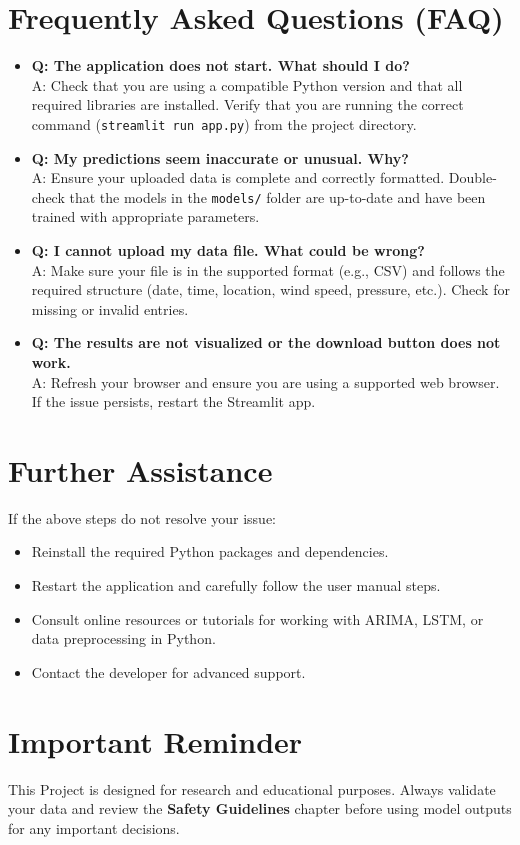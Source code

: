 \section*{Frequently Asked Questions (FAQ)}
\begin{itemize}
	\item \textbf{Q: The application does not start. What should I do?} \\
	A: Check that you are using a compatible Python version and that all required libraries are installed. Verify that you are running the correct command (\texttt{streamlit run app.py}) from the project directory.
	
	\item \textbf{Q: My predictions seem inaccurate or unusual. Why?} \\
	A: Ensure your uploaded data is complete and correctly formatted. Double-check that the models in the \texttt{models/} folder are up-to-date and have been trained with appropriate parameters.
	
	\item \textbf{Q: I cannot upload my data file. What could be wrong?} \\
	A: Make sure your file is in the supported format (e.g., CSV) and follows the required structure (date, time, location, wind speed, pressure, etc.). Check for missing or invalid entries.
	
	\item \textbf{Q: The results are not visualized or the download button does not work.} \\
	A: Refresh your browser and ensure you are using a supported web browser. If the issue persists, restart the Streamlit app.
\end{itemize}

\section*{Further Assistance}
If the above steps do not resolve your issue:
\begin{itemize}
	\item Reinstall the required Python packages and dependencies.
	\item Restart the application and carefully follow the user manual steps.
	\item Consult online resources or tutorials for working with ARIMA, LSTM, or data preprocessing in Python.
	\item Contact the developer for advanced support.
\end{itemize}

\section*{Important Reminder}
This Project is designed for research and educational purposes. Always validate your data and review the \textbf{Safety Guidelines} chapter before using model outputs for any important decisions.








